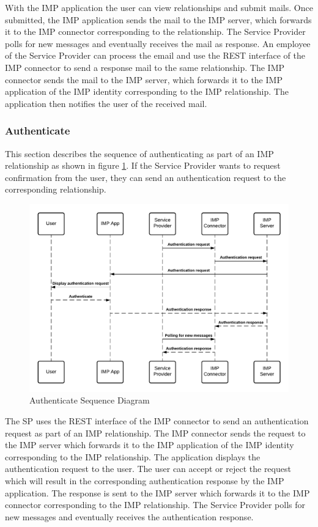 With the IMP application the user can view relationships and submit mails. Once submitted, the IMP application sends the mail to the IMP server, which forwards it to the IMP connector corresponding to the relationship. The Service Provider polls for new messages and eventually receives the mail as response. An employee of the Service Provider can process the email and use the REST interface of the IMP connector to send a response mail to the same relationship. The IMP connector sends the mail to the IMP server, which forwards it to the IMP application of the IMP identity corresponding to the IMP relationship. The application then notifies the user of the received mail.

\subsubsection{Authenticate}
This section describes the sequence of authenticating as part of an IMP relationship as shown in figure \ref{imp:authenticate}.
If the Service Provider wants to request confirmation from the user, they can send an authentication request to the corresponding relationship.

\begin{figure}[h!]
    \centering
    \includegraphics[scale=0.6]{Diagrams/IMP Use Case Authenticate Sequence Diagram.pdf}
    \caption{Authenticate Sequence Diagram}
    \label{imp:authenticate}
\end{figure}

The SP uses the REST interface of the IMP connector to send an authentication request as part of an IMP relationship. The IMP connector sends the request to the IMP server which forwards it to the IMP application of the IMP identity corresponding to the IMP relationship. The application displays the authentication request to the user. The user can accept or reject the request which will result in the corresponding authentication response by the IMP application. The response is sent to the IMP server which forwards it to the IMP connector corresponding to the IMP relationship. The Service Provider polls for new messages and eventually receives the authentication response.